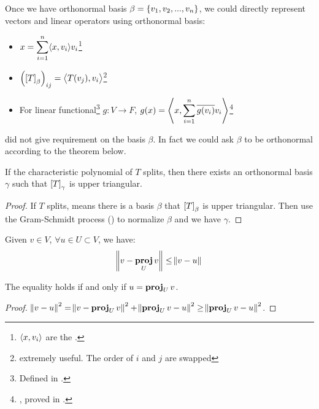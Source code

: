 Once we have orthonormal basis $\beta = \set{v_1, v_2, ..., v_n}$,  we could directly represent vectors and linear operators using orthonormal basis:
\begin{itemize}
    \item $\displaystyle x = \sum_{i=1}^n \innerproduct{x}{v_i} v_i$\footnote{$\innerproduct{x}{v_i}$ are the .}
    \item $\mleft(\coordinate{T}_\beta\mright)_{ij} = \innerproduct{T(v_j)}{v_i}$\footnote{extremely useful. The order of $i$ and $j$ are swapped}
    \item For linear functional\footnote{Defined in .} $g: V \rightarrow F$, $g(x) = \innerproduct{x}{\sum_{i=1}^n \conjugate{g(v_i)} v_i}$\footnote{, proved in .}
\end{itemize}


 did not give requirement on the basis $\beta$. In fact we could ask $\beta$ to be orthonormal according to the theorem below.

\begin{theorem}\label{schur_theorem}
    If the characteristic polynomial of $T$ splits, then there exists an orthonormal basis $\gamma$ such that $\coordinate{T}_\gamma$ is upper triangular.
\end{theorem}
\begin{proof}
    If $T$ splits,  means there is a basis $\beta$ that $\coordinate{T}_\beta$ is upper triangular. Then use the Gram-Schmidt process () to normalize $\beta$ and we have $\gamma$.
\end{proof}



\begin{theorem}
    Given $v \in V$, $\forall u \in U \subset V$, we have:
    \begin{equation}
        \norm{v - \projection{v}{U}} \leq \norm{v - u}
    \end{equation}
    
    The equality holds if and only if $u = \projection{v}{U}$.
\end{theorem}
\begin{proof}
    $\norm{v - u}^2 = \norm{v - \projection{v}{U}}^2 + \norm{\projection{v}{U} - u}^2 \geq \norm{\projection{v}{U} - u}^2$.
\end{proof}




